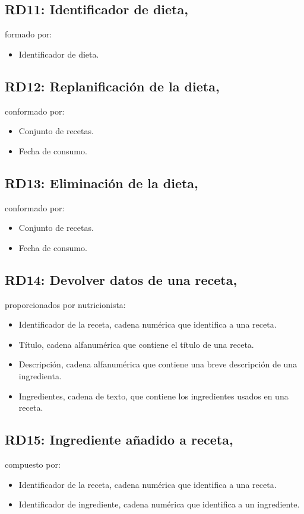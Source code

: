 \documentclass[12pt,letterpaper]{article}
\begin{document}
\subsection{RD11: Identificador de dieta,} formado por:
\begin{itemize}
\item Identificador de dieta.

\end{itemize} 
\subsection{RD12: Replanificación de la dieta,} conformado por:
\begin{itemize}
\item Conjunto de recetas.
\item Fecha de consumo.

\end{itemize} 
\subsection{RD13: Eliminación de la dieta,} conformado por:
\begin{itemize}
\item Conjunto de recetas.
\item Fecha de consumo.

\end{itemize} 
\subsection{RD14: Devolver datos de una receta,} proporcionados por nutricionista:
\begin{itemize}
\item Identificador de la receta, cadena numérica que identifica a una receta.
\item Título, cadena alfanumérica que contiene el título de una receta.
\item Descripción, cadena alfanumérica que contiene una breve descripción de una ingredienta.
\item Ingredientes, cadena de texto, que contiene los ingredientes usados en una receta.

\end{itemize} 
\subsection{RD15: Ingrediente añadido a receta,} compuesto por:
\begin{itemize}
\item Identificador de la receta, cadena numérica que identifica a una receta.
\item Identificador de ingrediente, cadena numérica que identifica a un ingrediente.

\end{itemize} 
\end{document}

